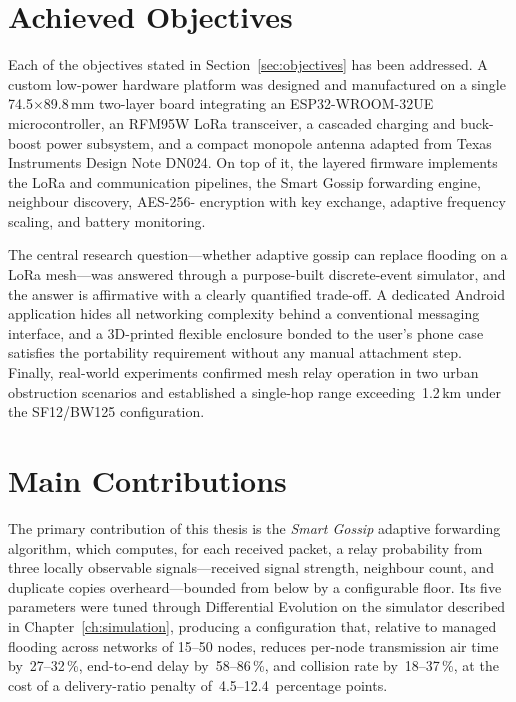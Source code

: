 \documentclass[english,bachelor]{tfgitic}[2026/01/22]
\begin{document}
\section{Achieved Objectives}

Each of the objectives stated in Section~\ref{sec:objectives} has been addressed. A custom low-power hardware platform was designed and manufactured on a single 74.5$\times$89.8\,mm two-layer board integrating an ESP32-WROOM-32UE microcontroller, an RFM95W LoRa transceiver, a cascaded charging and buck-boost power subsystem, and a compact  monopole antenna adapted from Texas Instruments Design Note DN024. On top of it, the layered firmware implements the LoRa and  communication pipelines, the Smart Gossip forwarding engine, neighbour discovery, AES-256- encryption with  key exchange, adaptive  frequency scaling, and battery monitoring.

The central research question---whether adaptive gossip can replace flooding on a LoRa mesh---was answered through a purpose-built discrete-event simulator, and the answer is affirmative with a clearly quantified trade-off. A dedicated Android application hides all networking complexity behind a conventional messaging interface, and a 3D-printed flexible enclosure bonded to the user's phone case satisfies the portability requirement without any manual attachment step. Finally, real-world experiments confirmed mesh relay operation in two urban obstruction scenarios and established a single-hop range exceeding~1.2\,km under the SF12/BW125 configuration.

\section{Main Contributions}

The primary contribution of this thesis is the \emph{Smart Gossip} adaptive forwarding algorithm, which computes, for each received packet, a relay probability from three locally observable signals---received signal strength, neighbour count, and duplicate copies overheard---bounded from below by a configurable floor. Its five parameters were tuned through Differential Evolution on the simulator described in Chapter~\ref{ch:simulation}, producing a configuration that, relative to managed flooding across networks of 15--50 nodes, reduces per-node transmission air time by~27--32\,\%, end-to-end delay by~58--86\,\%, and collision rate by~18--37\,\%, at the cost of a delivery-ratio penalty of~4.5--12.4~percentage points.
\end{document}
